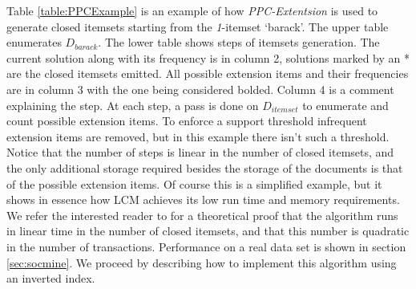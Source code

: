\documentclass{sig-alternate}
\begin{document}


Table \ref{table:PPCExample} is an example of how \emph{PPC-Extentsion} is used to generate closed itemsets starting from the  \emph{1}-itemset `barack'. The upper table enumerates $D_{barack}$. %
The lower table shows steps of itemsets generation. The current solution along with its frequency is in column 2, solutions marked by an * are the closed itemsets emitted. All possible extension items and their frequencies are in column 3 with the one being considered bolded. Column 4 is a comment explaining the step. At each step, a pass is done on $D_{itemset}$ to enumerate and count possible extension items.
To enforce a support threshold infrequent extension items are removed, but in this example there isn't such a threshold. Notice that the number of steps is linear in the number of closed itemsets, and the only additional storage required besides the storage of the documents is that of the possible extension items. Of course this is a simplified example, but it shows in essence how LCM achieves its low run time and memory requirements. We refer the interested reader to \cite{uno2004lcm} for a theoretical proof that the algorithm runs in linear time in the number of closed itemsets, and that this number is quadratic in the number of transactions. Performance on a real data set is shown in section \ref{sec:socmine}. We proceed by describing how to implement this algorithm using an inverted index.

\end{document}
